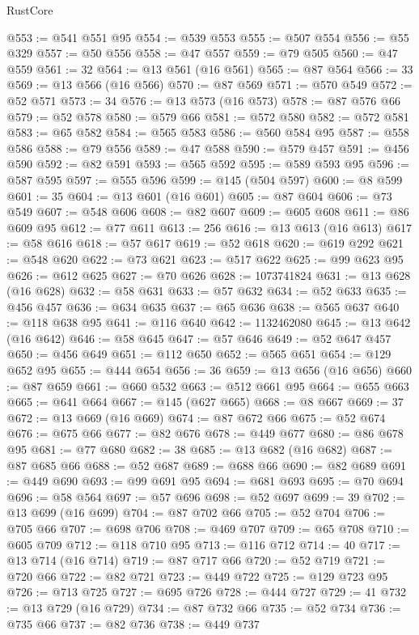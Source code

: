 \begin{lexlean}{RustCore}
\begin{coremodule}
@553 := @541 @551 @95
@554 := @539 @553
@555 := @507 @554
@556 := @55 @329
@557 := @50 @556
@558 := @47 @557
@559 := @79 @505
@560 := @47 @559
@561 := 32
@564 := @13 @561 (@16 @561)
@565 := @87 @564
@566 := 33
@569 := @13 @566 (@16 @566)
@570 := @87 @569
@571 := @570 @549
@572 := @52 @571
@573 := 34
@576 := @13 @573 (@16 @573)
@578 := @87 @576 @66
@579 := @52 @578
@580 := @579 @66
@581 := @572 @580
@582 := @572 @581
@583 := @65 @582
@584 := @565 @583
@586 := @560 @584 @95
@587 := @558 @586
@588 := @79 @556
@589 := @47 @588
@590 := @579 @457
@591 := @456 @590
@592 := @82 @591
@593 := @565 @592
@595 := @589 @593 @95
@596 := @587 @595
@597 := @555 @596
@599 := @145 (@504 @597)
@600 := @8 @599
@601 := 35
@604 := @13 @601 (@16 @601)
@605 := @87 @604
@606 := @73 @549
@607 := @548 @606
@608 := @82 @607
@609 := @605 @608
@611 := @86 @609 @95
@612 := @77 @611
@613 := 256
@616 := @13 @613 (@16 @613)
@617 := @58 @616
@618 := @57 @617
@619 := @52 @618
@620 := @619 @292
@621 := @548 @620
@622 := @73 @621
@623 := @517 @622
@625 := @99 @623 @95
@626 := @612 @625
@627 := @70 @626
@628 := 1073741824
@631 := @13 @628 (@16 @628)
@632 := @58 @631
@633 := @57 @632
@634 := @52 @633
@635 := @456 @457
@636 := @634 @635
@637 := @65 @636
@638 := @565 @637
@640 := @118 @638 @95
@641 := @116 @640
@642 := 1132462080
@645 := @13 @642 (@16 @642)
@646 := @58 @645
@647 := @57 @646
@649 := @52 @647 @457
@650 := @456 @649
@651 := @112 @650
@652 := @565 @651
@654 := @129 @652 @95
@655 := @444 @654
@656 := 36
@659 := @13 @656 (@16 @656)
@660 := @87 @659
@661 := @660 @532
@663 := @512 @661 @95
@664 := @655 @663
@665 := @641 @664
@667 := @145 (@627 @665)
@668 := @8 @667
@669 := 37
@672 := @13 @669 (@16 @669)
@674 := @87 @672 @66
@675 := @52 @674
@676 := @675 @66
@677 := @82 @676
@678 := @449 @677
@680 := @86 @678 @95
@681 := @77 @680
@682 := 38
@685 := @13 @682 (@16 @682)
@687 := @87 @685 @66
@688 := @52 @687
@689 := @688 @66
@690 := @82 @689
@691 := @449 @690
@693 := @99 @691 @95
@694 := @681 @693
@695 := @70 @694
@696 := @58 @564
@697 := @57 @696
@698 := @52 @697
@699 := 39
@702 := @13 @699 (@16 @699)
@704 := @87 @702 @66
@705 := @52 @704
@706 := @705 @66
@707 := @698 @706
@708 := @469 @707
@709 := @65 @708
@710 := @605 @709
@712 := @118 @710 @95
@713 := @116 @712
@714 := 40
@717 := @13 @714 (@16 @714)
@719 := @87 @717 @66
@720 := @52 @719
@721 := @720 @66
@722 := @82 @721
@723 := @449 @722
@725 := @129 @723 @95
@726 := @713 @725
@727 := @695 @726
@728 := @444 @727
@729 := 41
@732 := @13 @729 (@16 @729)
@734 := @87 @732 @66
@735 := @52 @734
@736 := @735 @66
@737 := @82 @736
@738 := @449 @737

\end{coremodule}
\end{lexlean}
